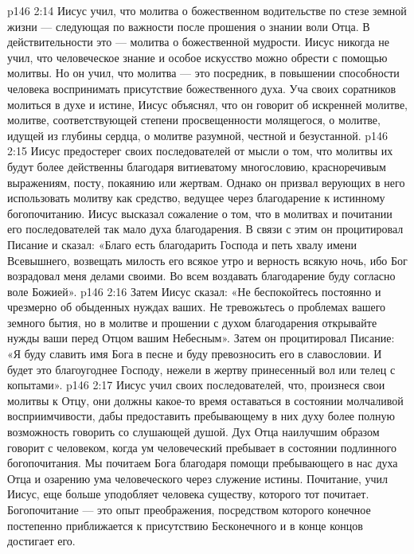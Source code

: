 \vs p146 2:14 \pc {}\bibnobreakspace Иисус учил, что молитва о божественном водительстве по стезе земной жизни --- следующая по важности после прошения о знании воли Отца. В действительности это --- молитва о божественной мудрости. Иисус никогда не учил, что человеческое знание и особое искусство можно обрести с помощью молитвы. Но он учил, что молитва --- это посредник, в повышении способности человека воспринимать присутствие божественного духа. Уча своих соратников молиться в духе и истине, Иисус объяснял, что он говорит об искренней молитве, молитве, соответствующей степени просвещенности молящегося, о молитве, идущей из глубины сердца, о молитве разумной, честной и безустанной.
\vs p146 2:15 \pc {}\bibnobreakspace Иисус предостерег своих последователей от мысли о том, что молитвы их будут более действенны благодаря витиеватому многословию, красноречивым выражениям, посту, покаянию или жертвам. Однако он призвал верующих в него использовать молитву как средство, ведущее через благодарение к истинному богопочитанию. Иисус высказал сожаление о том, что в молитвах и почитании его последователей так мало духа благодарения. В связи с этим он процитировал Писание и сказал: «Благо есть благодарить Господа и петь хвалу имени Всевышнего, возвещать милость его всякое утро и верность всякую ночь, ибо Бог возрадовал меня делами своими. Во всем воздавать благодарение буду согласно воле Божией».
\vs p146 2:16 \pc {}\bibnobreakspace Затем Иисус сказал: «Не беспокойтесь постоянно и чрезмерно об обыденных нуждах ваших. Не тревожьтесь о проблемах вашего земного бытия, но в молитве и прошении с духом благодарения открывайте нужды ваши перед Отцом вашим Небесным». Затем он процитировал Писание: «Я буду славить имя Бога в песне и буду превозносить его в славословии. И будет это благоугоднее Господу, нежели в жертву принесенный вол или телец с копытами».
\vs p146 2:17 \pc {}\bibnobreakspace Иисус учил своих последователей, что, произнеся свои молитвы к Отцу, они должны какое\hyp{}то время оставаться в состоянии молчаливой восприимчивости, дабы предоставить пребывающему в них духу более полную возможность говорить со слушающей душой. Дух Отца наилучшим образом говорит с человеком, когда ум человеческий пребывает в состоянии подлинного богопочитания. Мы почитаем Бога благодаря помощи пребывающего в нас духа Отца и озарению ума человеческого через служение истины. Почитание, учил Иисус, еще больше уподобляет человека существу, которого тот почитает. Богопочитание --- это опыт преображения, посредством которого конечное постепенно приближается к присутствию Бесконечного и в конце концов достигает его.
